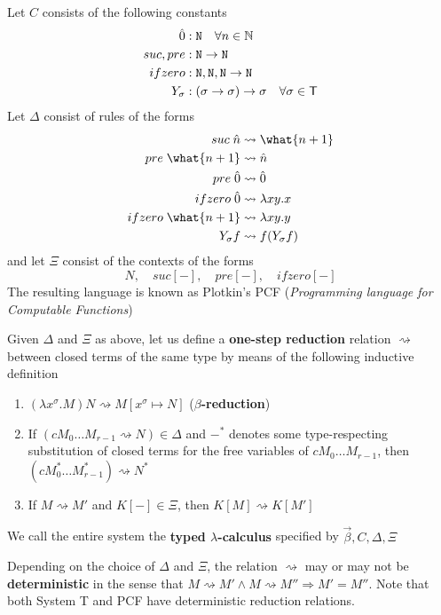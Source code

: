 \documentclass[11pt]{article}
\begin{document}
\begin{examplle}
Let \(C\) consists of the following constants
\begin{align*}
\hat{0}&:\texttt{N}\quad\forall n\in\mathbb{N}\\
suc,pre&:\texttt{N}\to\texttt{N}\\
ifzero&:\texttt{N},\texttt{N},\texttt{N}\to\texttt{N}\\
Y_\sigma&:(\sigma\to\sigma)\to\sigma\quad\forall\sigma\in\textsf{T}
\end{align*}
Let \(\Delta\) consist of rules of the forms
\begin{align*}
suc\;\hatn&\rightsquigarrow\what{n+1}\\
pre\;\what{n+1}&\rightsquigarrow\hatn\\
pre\;\hat{0}&\rightsquigarrow\hat{0}\\
ifzero\;\hat{0}&\rightsquigarrow\lambda xy.x\\
ifzero\;\what{n+1}&\rightsquigarrow\lambda xy.y\\
Y_\sigma f&\rightsquigarrow f(Y_\sigma f)
\end{align*}
and let \(\Xi\) consist of the contexts of the forms
\begin{equation*}
[-]N,\quad suc[-],\quad pre[-],\quad ifzero[-]
\end{equation*}
The resulting language is known as Plotkin's PCF (\emph{Programming language for Computable Functions})
\end{examplle}

Given \(\Delta\) and \(\Xi\) as above, let us define a \textbf{one-step reduction} relation \(\rightsquigarrow\) between closed terms
of the same type by means of the following inductive definition
\begin{enumerate}
\item \((\lambda x^\sigma.M)N\rightsquigarrow M[x^\sigma\mapsto N]\) (\textbf{\(\beta\)-reduction})
\item If \((cM_0\dots M_{r-1}\rightsquigarrow N)\in\Delta\) and \(-^*\) denotes some type-respecting substitution of closed
terms for the free variables of \(cM_0\dots M_{r-1}\),
then \((cM_0^*\dots M_{r-1}^*)\rightsquigarrow N^*\)
\item If \(M\rightsquigarrow M'\) and \(K[-]\in\Xi\), then \(K[M]\rightsquigarrow K[M']\)
\end{enumerate}


We call the entire system the \textbf{typed \(\lambda\)-calculus} specified by \(\vec{\beta},C,\Delta,\Xi\)

Depending on the choice of \(\Delta\) and \(\Xi\), the relation \(\rightsquigarrow\) may or may not be \textbf{deterministic} in the
sense that \(M\rightsquigarrow M'\wedge M\rightsquigarrow M''\Rightarrow M'=M''\). Note that both System T and PCF have deterministic
reduction relations.
\end{document}
